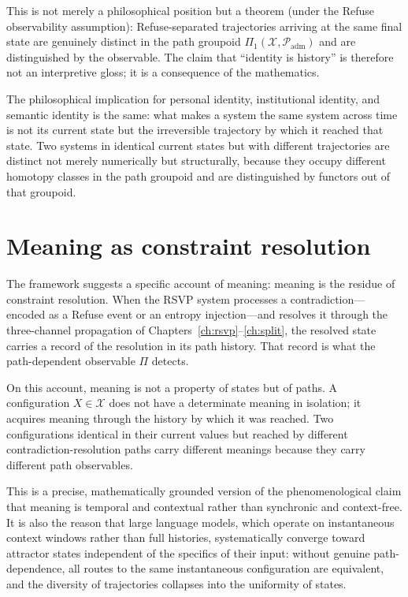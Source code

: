\documentclass[12pt, oneside]{memoir}
\newcommand{\X}{\mathcal{X}}
\newcommand{\Padm}{\mathcal{P}_{\mathrm{adm}}}
\begin{document}
This is not merely a philosophical position but a theorem (under the Refuse observability
assumption): Refuse-separated trajectories arriving at the same final state are genuinely
distinct in the path groupoid $\Pi_1(\X, \Padm)$ and are distinguished by the observable.
The claim that ``identity is history'' is therefore not an interpretive gloss; it is a
consequence of the mathematics.

The philosophical implication for personal identity, institutional identity, and semantic
identity is the same: what makes a system the same system across time is not its current
state but the irreversible trajectory by which it reached that state.  Two systems in
identical current states but with different trajectories are distinct not merely
numerically but structurally, because they occupy different homotopy classes in the path
groupoid and are distinguished by functors out of that groupoid.

\section{Meaning as constraint resolution}

The framework suggests a specific account of meaning: meaning is the residue of
constraint resolution.  When the RSVP system processes a contradiction---encoded as a
Refuse event or an entropy injection---and resolves it through the three-channel
propagation of Chapters~\ref{ch:rsvp}--\ref{ch:split}, the resolved state carries a
record of the resolution in its path history.  That record is what the path-dependent
observable $\Pi$ detects.

On this account, meaning is not a property of states but of paths.  A configuration
$X \in \X$ does not have a determinate meaning in isolation; it acquires meaning through
the history by which it was reached.  Two configurations identical in their current
values but reached by different contradiction-resolution paths carry different meanings
because they carry different path observables.

This is a precise, mathematically grounded version of the phenomenological claim that
meaning is temporal and contextual rather than synchronic and context-free.  It is also
the reason that large language models, which operate on instantaneous context windows
rather than full histories, systematically converge toward attractor states independent
of the specifics of their input: without genuine path-dependence, all routes to the same
instantaneous configuration are equivalent, and the diversity of trajectories collapses
into the uniformity of states.
\end{document}
